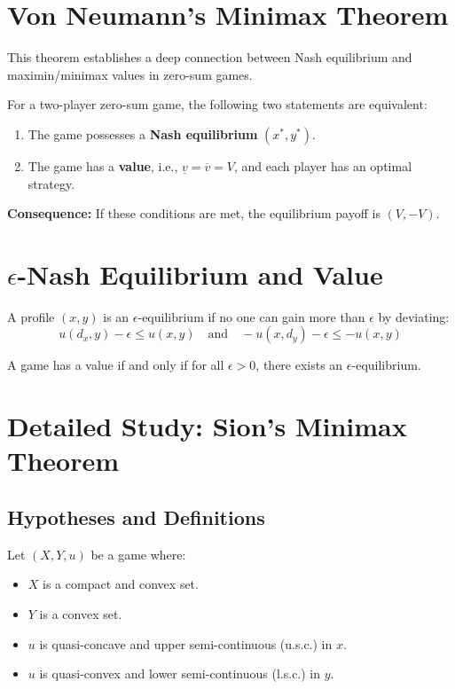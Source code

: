 \section{Von Neumann's Minimax Theorem}

This theorem establishes a deep connection between Nash equilibrium and maximin/minimax values in zero-sum games.

\begin{theoreme}
For a two-player zero-sum game, the following two statements are equivalent:
\begin{enumerate}
    \item The game possesses a \textbf{Nash equilibrium} $(x^*, y^*)$.
    \item The game has a \textbf{value}, i.e., $\underline{v} = \overline{v} = V$, and each player has an optimal strategy.
\end{enumerate}
\textbf{Consequence:} If these conditions are met, the equilibrium payoff is $(V, -V)$.
\end{theoreme}

\section{$\epsilon$-Nash Equilibrium and Value}

\begin{definition}
A profile $(x, y)$ is an $\epsilon$-equilibrium if no one can gain more than $\epsilon$ by deviating:
$$u(d_x, y) - \epsilon \le u(x, y) \quad \text{and} \quad -u(x, d_y) - \epsilon \le -u(x, y)$$
\end{definition}

\begin{proposition}
A game has a value if and only if for all $\epsilon > 0$, there exists an $\epsilon$-equilibrium.
\end{proposition}

\section{Detailed Study: Sion's Minimax Theorem}

\subsection{Hypotheses and Definitions}
Let $(X, Y, u)$ be a game where:
\begin{itemize}
    \item $X$ is a compact and convex set.
    \item $Y$ is a convex set.
    \item $u$ is quasi-concave and upper semi-continuous (u.s.c.) in $x$.
    \item $u$ is quasi-convex and lower semi-continuous (l.s.c.) in $y$.
\end{itemize}

